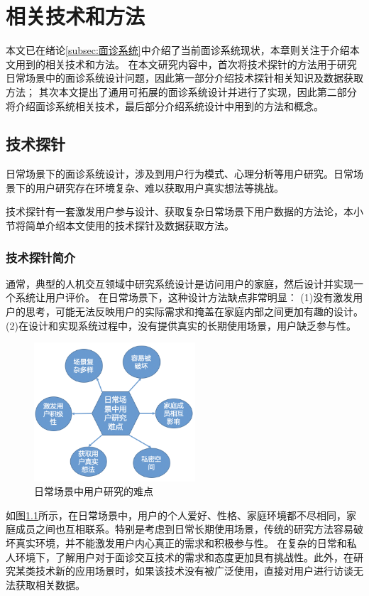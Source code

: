 \chapter{相关技术和方法}
本文已在绪论\ref{subsec:面诊系统}中介绍了当前面诊系统现状，本章则关注于介绍本文用到的相关技术和方法。
在本文研究内容中，首次将技术探针的方法用于研究日常场景中的面诊系统设计问题，因此第一部分介绍技术探针相关知识及数据获取方法；
其次本文提出了通用可拓展的面诊系统设计并进行了实现，因此第二部分将介绍面诊系统相关技术，最后部分介绍系统设计中用到的方法和概念。

\section{技术探针}
日常场景下的面诊系统设计，涉及到用户行为模式、心理分析等用户研究。日常场景下的用户研究存在环境复杂、难以获取用户真实想法等挑战。

技术探针有一套激发用户参与设计、获取复杂日常场景下用户数据的方法论，本小节将简单介绍本文使用的技术探针及数据获取方法。

\subsection{技术探针简介}

通常，典型的人机交互领域中研究系统设计是访问用户的家庭，然后设计并实现一个系统让用户评价。
在日常场景下，这种设计方法缺点非常明显\cite{Hutchinson2003Technology}：
(1)没有激发用户的思考，可能无法反映用户的实际需求和掩盖在家庭内部之间更加有趣的设计。
(2)在设计和实现系统过程中，没有提供真实的长期使用场景，用户缺乏参与性。

\begin{figure}[h]
    \centering
    \includegraphics[width=6cm]{images/user_study_hard.png}
    \caption{日常场景中用户研究的难点}
    \label{fig:user_study_hard}
\end{figure}

如图\ref{fig:user_study_hard}所示，在日常场景中，用户的个人爱好、性格、家庭环境都不尽相同，家庭成员之间也互相联系。特别是考虑到日常长期使用场景，传统的研究方法容易破坏真实环境，并不能激发用户内心真正的需求和积极参与性。
在复杂的日常和私人环境下，了解用户对于面诊交互技术的需求和态度更加具有挑战性。此外，在研究某类技术新的应用场景时，如果该技术没有被广泛使用，直接对用户进行访谈无法获取相关数据。

